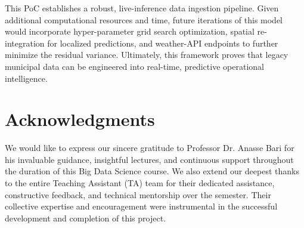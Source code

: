 \documentclass[conference]{IEEEtran}
\begin{document}
This PoC establishes a robust, live-inference data ingestion pipeline. Given additional computational resources and time, future iterations of this model would incorporate hyper-parameter grid search optimization, spatial re-integration for localized predictions, and weather-API endpoints to further minimize the residual variance. Ultimately, this framework proves that legacy municipal data can be engineered into real-time, predictive operational intelligence.

\section{Acknowledgments}
We would like to express our sincere gratitude to Professor Dr. Anasse Bari for his invaluable guidance, insightful lectures, and continuous support throughout the duration of this Big Data Science course. We also extend our deepest thanks to the entire Teaching Assistant (TA) team for their dedicated assistance, constructive feedback, and technical mentorship over the semester. Their collective expertise and encouragement were instrumental in the successful development and completion of this project.
\end{document}
